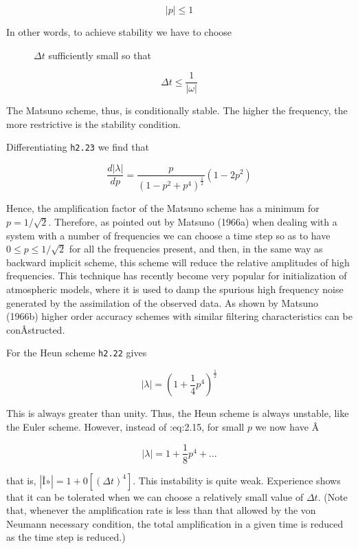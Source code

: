 \[| p | \leq 1\]

\begin{description}
\item[In other words, to achieve stability we have to choose]
\(\Delta t\) sufficiently small so that
\end{description}

{\[\Delta t \leq \frac{1}{| \omega |}\]}

The Matsuno scheme, thus, is conditionally stable. The higher the
frequency, the more restrictive is the stability condition.

Differentiating \texttt{h2.23} we find that

{\[\frac{d |\lambda|}{d p} = \frac{p}{( 1 - p^2 + p^4 )^{\frac{1}{2}} } ( 1 - 2 p^2 )\]}

Hence, the amplification factor of the Matsuno scheme has a minimum for
\(p = 1/\sqrt{2}\). Therefore, as pointed out by Matsuno (1966a) when
dealing with a system with a number of frequencies we can choose a time
step so as to have \(0 \leq p \leq 1/\sqrt{2}\) for all the frequencies
present, and then, in the same way as backward implicit scheme, this
scheme will reduce the relative amplitudes of high frequencies. This
technique has recently become very popular for initialization of
atmospheric models, where it is used to damp the spurious high frequency
noise generated by the assimilation of the observed data. As shown by
Matsuno (1966b) higher order accuracy schemes with similar filtering
characteristics can be conÂ­structed.

For the Heun scheme \texttt{h2.22} gives

{\[| \lambda | = \left( 1 + \frac{1}{4}p^{4} \right)^{\frac{1}{2}}\]}

This is always greater than unity. Thus, the Heun scheme is always
unstable, like the Euler scheme. However, instead of :eq:2.15, for small
\(p\) we now have Â­

{\[| \lambda | = 1 + \frac{1}{8}p^{4} + \ldots\]}

that is,
\(\left| \text{Î»} \right| = 1 + 0\left\lbrack \left( \Delta t \right)^{4} \right\rbrack\).
This instability is quite weak. Experience shows that it can be
tolerated when we can choose a relatively small value of \(\Delta t\).
(Note that, whenever the amplification rate is less than that allowed by
the von Neumann necessary condition, the total amplification in a given
time is reduced as the time step is reduced.)

\begin{figure}
\centering
{}
\caption{}
\end{figure}

